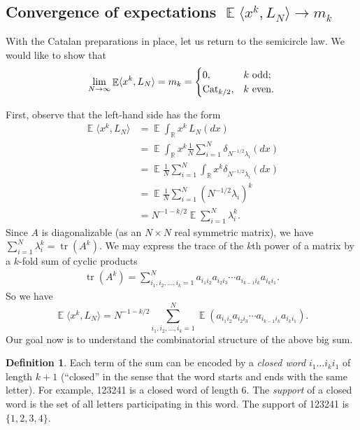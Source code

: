 \documentclass[letterpaper,11pt,oneside,reqno]{amsart}
\numberwithin{equation}{section}
\DeclareMathOperator{\EE}{\mathbb{E}}
\theoremstyle{definition}
\newtheorem{definition}[proposition]{Definition}
\begin{document}


\subsection{Convergence of expectations $\EE \langle x^k,L_N\rangle \to m_k$} %
\label{sub:convergence_of_expectations_}

With the Catalan preparations in place, let us return to the semicircle law. 
We would like to show that 
\begin{align}\label{desired_convergence_of_averages_in_WSCL}
	\lim_{N\to\infty}\EE \langle x^k,L_N\rangle = m_k=\begin{cases}
		0,&\textnormal{$k$ odd};\\
		\mathrm{Cat}_{k/2},&\textnormal{$k$ even}.
	\end{cases}
\end{align}

First, observe that the left-hand side has the form
\begin{equation*}
\begin{split}
\EE\langle x^k,L_N\rangle&=\EE\int_{\mathbb R}x^k\,L_N(dx)\\
&=\EE\int_{\mathbb R}x^k\frac{1}{N}\sum_{i=1}^N \delta_{N^{-1/2}\lambda_i}(dx)\\
&=\EE\frac{1}{N}\sum_{i=1}^N\int_{\mathbb R}x^k\delta_{N^{-1/2}\lambda_i}(dx)\\
&=\EE\frac{1}{N}\sum_{i=1}^N (N^{-1/2}\lambda_i)^k\\
&= N^{-1-k/2}\EE \sum_{i=1}^N \lambda_i^k.
\end{split}
\end{equation*}
Since $A$ is diagonalizable (as an $N\times N$ real symmetric matrix), we have $\sum_{i=1}^N \lambda_i^k=\mathop{\mathrm{tr}}(A^k)$. We may express the trace of the $k$th power of a matrix by a $k$-fold sum of cyclic products 
\begin{align*}
	\mathop{\mathrm{tr}}(A^k)=\sum_{i_1,i_2,\ldots, i_k=1}^N a_{i_1i_2}a_{i_2i_3}\cdots a_{i_{k-1}i_k}a_{i_ki_1}.
\end{align*}
So we have
\begin{equation}\label{WSCL_proof_0}
	\EE\langle x^k,L_N\rangle
	=N^{-1-k/2} \sum_{i_1,i_2,\ldots, i_k=1}^N \EE (a_{i_1i_2}a_{i_2i_3}\cdots a_{i_{k-1}i_k}a_{i_ki_1}).
\end{equation}
Our goal now is to understand the combinatorial structure of the above big sum.
\begin{definition}
Each term of the sum can be encoded by a \emph{closed word}
$i_1\ldots i_ki_1$ of length $k+1$ (``closed'' in the sense that the word
starts and ends with the same letter). 
For example, 123241 is a closed word of length 6.
The \emph{support} of a closed word is the set of all letters participating in this word.
The support of 123241 is $\{1,2,3,4\}$.
\end{definition}
\end{document}
